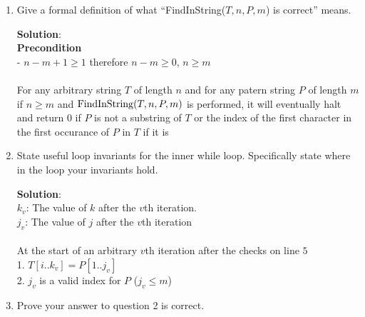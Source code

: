 \documentclass[11pt]{article}
\begin{document}
\begin{enumerate}

\item
\begin{question}
Give a formal definition of what ``FindInString($T,n,P,m$) is correct'' means.
\end{question}

\begin{solution}
{\bf Solution}:\\
{\bf Precondition}\\
- $n - m + 1 \ge 1 $ therefore $n-m \ge 0$, $n\ge m $\\\\
For any arbitrary string $T$ of length $n$ and for any patern string $P$ of length $m$ if $n\ge m$ and ${\rm FindInString}(T, n, P, m)$ is performed, it will eventually halt and return $0$ if $P$ is not a substring of $T$ or the index of the first character in the first occurance of $P$ in $T$ if it is\\
\end{solution}
\item
\begin{question}
State useful loop invariants for the inner while loop.
Specifically state where in the loop your invariants hold.
\end{question}

\begin{solution}
{\bf Solution}:\\
$k_v$: The value of $k$ after the $v$th iteration.\\
$j_v$: The value of $j$ after the $v$th iteration\\\\
At the start of an arbitrary $v$th iteration after the checks on line $5$\\
1. $T[i..k_v] = P[1..j_v]$\\
2. $j_{v}$ is a valid index for $P$ ($j_v\le m$)\\
\end{solution}

\item
\begin{question}
Prove your answer to question 2 is correct.
\end{question}


\end{enumerate}
\end{document}
